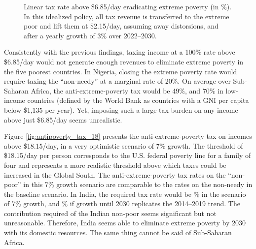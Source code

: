 \begin{figure}[h]
  \caption{Linear tax rate above \$6.85/day eradicating extreme poverty (in \%). In this idealized policy, all tax revenue is transferred to the extreme poor and lift them at \$2.15/day, assuming away distorsions, and after a yearly growth of 3\% over 2022--2030. 
  }\label{fig:antipoverty_tax_7}
\end{figure}

Consistently with the previous findings, taxing income at a 100\% rate above \$6.85/day would not generate enough revenues to eliminate extreme poverty in the five poorest countries. In Nigeria, closing the extreme poverty rate would require taxing the ``non-needy'' at a marginal rate of 20\%. %
On average over Sub-Saharan Africa, the anti-extreme-poverty tax would be 49\%, and 70\% in low-income countries (defined by the World Bank as countries with a GNI per capita below \$1,135 per year). Yet, imposing such a large tax burden on any income above just \$6.85/day seems unrealistic. 

Figure \ref{fig:antipoverty_tax_18} presents the anti-extreme-poverty tax on incomes above \$18.15/day, in a very optimistic scenario of 7\% growth. The threshold of \$18.15/day per person corresponds to the U.S. federal poverty line for a family of four and represents a more realistic threshold above which taxes could be increased in the Global South. The anti-extreme-poverty tax rates on the ``non-poor'' %
in this 7\% growth scenario are comparable to the rates on the non-needy in the baseline scenario. In India, the required tax rate would be \% in the scenario of 7\% growth, and \% if growth until 2030 replicates the 2014--2019 trend. %
The contribution required of the Indian non-poor seems significant but not unreasonable. Therefore, India seems able to eliminate extreme poverty by 2030 with its domestic resources. The same thing cannot be said of Sub-Saharan Africa. %

